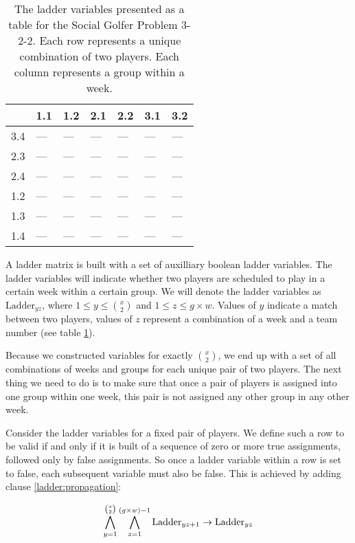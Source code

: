 \documentclass[a4paper]{scrartcl}
\begin{document}
\begin{table}[h]
\centering
\label{ladder:example}
\begin{tabular}{ l | l | l | l | l | l | l }

    & 1.1 & 1.2 & 2.1 & 2.2 & 3.1 & 3.2 \\
\hline
3.4 & --- & --- & --- & --- & --- & --- \\
2.3 & --- & --- & --- & --- & --- & --- \\
2.4 & --- & --- & --- & --- & --- & --- \\
1.2 & --- & --- & --- & --- & --- & --- \\
1.3 & --- & --- & --- & --- & --- & --- \\
1.4 & --- & --- & --- & --- & --- & --- \\

\end{tabular}
\caption{The ladder variables presented as a table for the Social Golfer Problem 3-2-2. Each row represents a unique combination of two players. Each column represents a group within a week.}
\end{table}

A ladder matrix is built with a set of auxilliary boolean ladder variables. The ladder variables will indicate whether two players are scheduled to play in a certain week within a certain group. We will denote the ladder variables as $\text{Ladder}_{yz}$, where $1 \leq y \leq {x \choose 2}$ and $1 \leq z \leq g \times w$. Values of $y$ indicate a match between two players, values of $z$ represent a combination of a week and a team number (see table \ref{ladder:example}). 



Because we constructed variables for exactly ${x \choose 2}$, we end up with a set of all combinations of weeks and groups for each unique pair of two players. The next thing we need to do is to make sure that once a pair of players is assigned into one group within one week, this pair is not assigned any other group in any other week.

Consider the ladder variables for a fixed pair of players. We define such a row to be valid if and only if it is built of a sequence of zero or more true assignments, followed only by false assignments. So once a ladder variable within a row is set to false, each subsequent variable must also be false. This is achieved by adding clause \ref{ladder:propagation}:

\begin{equation}
\label{ladder:propagation}
\centering
    \bigwedge \limits_{y=1}^{{x \choose 2}}
    \bigwedge \limits_{z=1}^{(g \times w)-1}
    \text{Ladder}_{yz+1}
    \to
    \text{Ladder}_{yz}
\end{equation}
\end{document}
